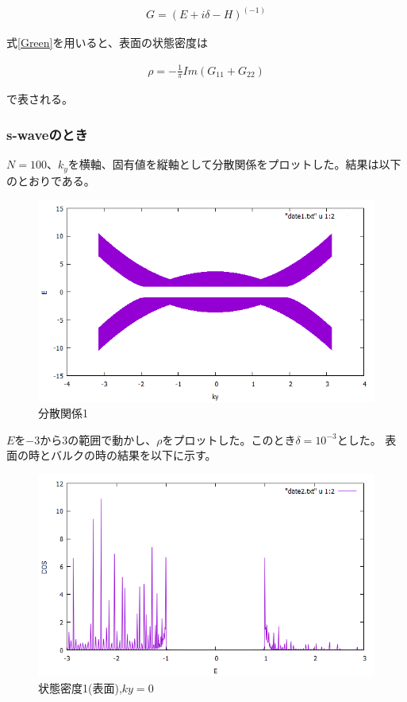 \documentclass{jsarticle}
\begin{document}
            \begin{align}
                G=(E+i\delta-H)^(-1)
                \label{Green}
            \end{align}

            式\eqref{Green}を用いると、表面の状態密度は
    
            \begin{align}
                \rho=-\frac{1}{\pi}Im(G_{11}+G_{22})
            \end{align}
    
            で表される。

            \subsubsection{s-waveのとき}
            $N=100$、$k_y$を横軸、固有値を縦軸として分散関係をプロットした。結果は以下のとおりである。
    
            \begin{figure}[H]
                \centering
                \includegraphics[scale=0.5]{BdG_bry.png}
                \caption{分散関係1}
                \label{Dispersion1}
            \end{figure}
    
            $E$を$-3$から$3$の範囲で動かし、$\rho$をプロットした。このとき$\delta=10^{-3}$とした。
            表面の時とバルクの時の結果を以下に示す。
    
            \begin{figure}[H]
                \centering
                \includegraphics[scale=0.5]{LDOS_bry.png}   
                \caption{状態密度1(表面),$ky=0$}
                \label{LDOS1}
            \end{figure}
\end{document}
